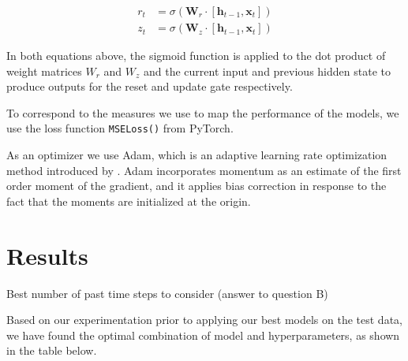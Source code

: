 \documentclass[conference]{IEEEtran}
\begin{document}
\begin{equation}
	\begin{aligned}r_t &= \sigma\left(\mathbf{W}_r \cdot [\mathbf{h}_{t-1}, \mathbf{x}_t]\right)\\z_t &= \sigma\left(\mathbf{W}_z \cdot [\mathbf{h}_{t-1}, \mathbf{x}_t]\right)\end{aligned}
\end{equation}

In both equations above, the sigmoid function is applied to the dot product of weight matrices $W_r$ and $W_z$ and the current input and previous hidden state to produce outputs for the reset and update gate respectively.

To correspond to the measures we use to map the performance of the models, we use the loss function \texttt{MSELoss()} from PyTorch.

As an optimizer we use Adam, which is an adaptive learning rate optimization method introduced by \cite{kingma2014adam}. Adam incorporates momentum as an estimate of the first order moment of the gradient, and it applies bias correction in response to the fact that the moments are initialized at the origin.

\section{Results}

Best number of past time steps to consider (answer to question B)

Based on our experimentation prior to applying our best models on the test data, we have found the optimal combination of model and hyperparameters, as shown in the table below.

\begin{table}[htpb]
	\centering
	\caption{Best Results per Model and Loss Function Combination}
	\label{table:model_comparison}
	\label{table:model_comparison}
\end{table}
\end{document}
